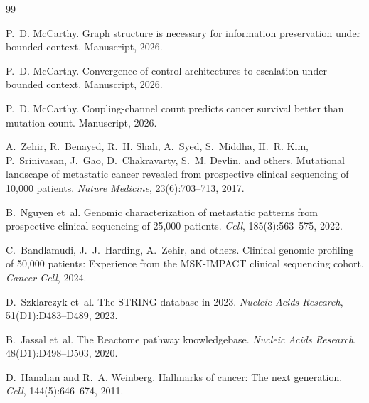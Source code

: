 \documentclass[11pt]{article}
\begin{document}

\begin{thebibliography}{99}

P.~D. McCarthy.
\newblock Graph structure is necessary for information preservation under
  bounded context.
\newblock Manuscript, 2026.

P.~D. McCarthy.
\newblock Convergence of control architectures to escalation under bounded
  context.
\newblock Manuscript, 2026.

P.~D. McCarthy.
\newblock Coupling-channel count predicts cancer survival better than mutation
  count.
\newblock Manuscript, 2026.

A.~Zehir, R.~Benayed, R.~H. Shah, A.~Syed, S.~Middha,
  H.~R. Kim, P.~Srinivasan, J.~Gao, D.~Chakravarty,
  S.~M. Devlin, and others.
\newblock Mutational landscape of metastatic cancer revealed from
  prospective clinical sequencing of 10,000 patients.
\newblock \emph{Nature Medicine}, 23(6):703--713, 2017.

B.~Nguyen et~al.
\newblock Genomic characterization of metastatic patterns from
  prospective clinical sequencing of 25,000 patients.
\newblock \emph{Cell}, 185(3):563--575, 2022.

C.~Bandlamudi, J.~J.~Harding, A.~Zehir, and others.
\newblock Clinical genomic profiling of 50,000 patients:
  Experience from the {MSK-IMPACT} clinical sequencing cohort.
\newblock \emph{Cancer Cell}, 2024.

D.~Szklarczyk et~al.
\newblock The {STRING} database in 2023.
\newblock \emph{Nucleic Acids Research}, 51(D1):D483--D489, 2023.

B.~Jassal et~al.
\newblock The {R}eactome pathway knowledgebase.
\newblock \emph{Nucleic Acids Research}, 48(D1):D498--D503, 2020.

D.~Hanahan and R.~A. Weinberg.
\newblock Hallmarks of cancer: The next generation.
\newblock \emph{Cell}, 144(5):646--674, 2011.

\end{thebibliography}
\end{document}
